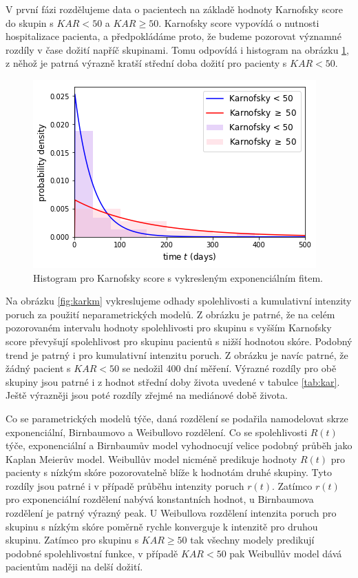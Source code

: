 \documentclass[10pt]{article}
\begin{document}
V první fázi rozdělujeme data o pacientech na základě hodnoty Karnofsky score do skupin s $KAR < 50$ a $KAR \geq 50$. Karnofsky score vypovídá o nutnosti hospitalizace pacienta, a předpokládáme proto, že budeme pozorovat významné rozdíly v čase dožití napříč skupinami. Tomu odpovídá i histogram na obrázku \ref{fig:karhist}, z něhož je patrná výrazně kratší střední doba dožití pro pacienty s $KAR < 50$.

\begin{figure}[htb!]
\centering
\includegraphics[width=.6\textwidth]{Images/kar/histexp.png} 
\caption{Histogram pro Karnofsky score s vykresleným exponenciálním fitem.}\label{fig:karhist} 
\end{figure}
Na obrázku \ref{fig:karkm} vykreslujeme odhady spolehlivosti a kumulativní intenzity poruch za použití neparametrických modelů. Z obrázku je patrné, že na celém pozorovaném intervalu hodnoty spolehlivosti pro skupinu s vyšším Karnofsky score převyšují spolehlivost pro skupinu pacientů s nižší hodnotou skóre. Podobný trend je patrný i pro kumulativní intenzitu poruch. Z obrázku je navíc patrné, že žádný pacient s $KAR < 50 $ se nedožil 400 dní měření. Výrazné rozdíly pro obě skupiny jsou patrné i z hodnot střední doby života uvedené v tabulce \ref{tab:kar}. Ještě výrazněji jsou poté rozdíly zřejmé na mediánové době života.

Co se parametrických modelů týče, daná rozdělení se podařila namodelovat skrze exponenciální, Birnbaumovo a Weibullovo rozdělení. Co se spolehlivosti $R(t)$ týče, exponenciální a Birnbaumův model vyhodnocují velice podobný průběh jako Kaplan Meierův model. Weibullův model nicméně predikuje hodnoty $R(t)$ pro pacienty s nízkým skóre pozorovatelně blíže k hodnotám druhé skupiny. Tyto rozdíly jsou patrné i v případě průběhu intenzity poruch $r(t)$. Zatímco $r(t)$ pro exponenciální rozdělení nabývá konstantních hodnot, u Birnbaumova rozdělení je patrný výrazný peak. U Weibullova rozdělení intenzita poruch pro skupinu s nízkým skóre poměrně rychle konverguje k intenzitě pro druhou skupinu. Zatímco pro skupinu s $KAR \geq 50$ tak všechny modely predikují podobné spolehlivostní funkce, v případě $KAR < 50$ pak Weibullův model dává pacientům naději na delší dožití.
\end{document}
